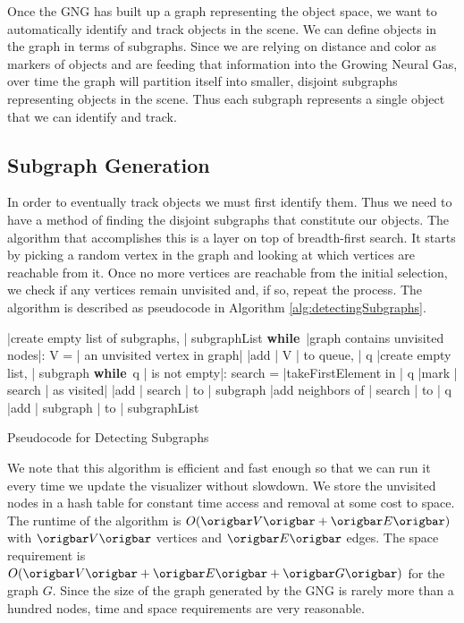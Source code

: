 \documentclass{article}
\renewcommand{\|}{\origbar} %
\renewcommand{\WHILE}{\mbox{{\bf while} }\tab}
\begin{document}
Once the GNG has built up a graph representing the object space, we want to automatically identify and track objects in the scene. We can define objects in the graph in terms of subgraphs. Since we are relying on distance and color as markers of objects and are feeding that information into the Growing Neural Gas, over time the graph will partition itself into smaller, disjoint subgraphs representing objects in the scene. Thus each subgraph represents a single object that we can identify and track.

\subsection{Subgraph Generation}

In order to eventually track objects we must first identify them. Thus we need to have a method of finding the disjoint subgraphs that constitute our objects. The algorithm that accomplishes this is a layer on top of breadth-first search. It starts by picking a random vertex in the graph and looking at which vertices are reachable from it. Once no more vertices are reachable from the initial selection, we check if any vertices remain unvisited and, if so, repeat the process. The algorithm is described as pseudocode in Algorithm \ref{alg:detectingSubgraphs}.

\begin{Algorithm}[h!]
\begin{program}
  |create empty list of subgraphs, | subgraphList 
  \WHILE |graph contains unvisited nodes|:
    V = | an unvisited vertex in graph|
    |add | V | to queue, | q
    |create empty list, | subgraph 
    \WHILE q | is not empty|:
      search = |takeFirstElement in | q 
      |mark | search | as visited|
      |add | search | to | subgraph
      |add neighbors of | search | to | q \untab
  |add | subgraph | to | subgraphList
\end{program}
\caption{Pseudocode for Detecting Subgraphs}
\label{alg:detectingSubgraphs}
\end{Algorithm}

We note that this algorithm is efficient and fast enough so that we can run it every time we update the visualizer without slowdown. We store the unvisited nodes in a hash table for constant time access and removal at some cost to space. The runtime of the algorithm is $O(\|V\|+\|E\|)$ with $\|V\|$ vertices and $\|E\|$ edges. The space requirement is $O(\|V\|+\|E\|+\|G\|)$ for the graph $G$. Since the size of the graph generated by the GNG is rarely more than a hundred nodes, time and space requirements are very reasonable.
\end{document}

